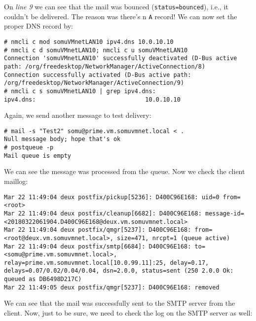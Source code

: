 \noindent
On \textit{line 9} we can see that the mail was bounced (\verb|status=bounced|), i.e., it couldn't be delivered. The reason was there's n \verb|A| record! We can now set the proper DNS record by:

\vspace{-15pt}
\begin{verbatim}
# nmcli c mod somuVMnetLAN10 ipv4.dns 10.0.10.10
# nmcli c d somuVMnetLAN10; nmcli c u somuVMnetLAN10 
Connection 'somuVMnetLAN10' successfully deactivated (D-Bus active path: /org/freedesktop/NetworkManager/ActiveConnection/8)
Connection successfully activated (D-Bus active path: /org/freedesktop/NetworkManager/ActiveConnection/9)
# nmcli c s somuVMnetLAN10 | grep ipv4.dns:
ipv4.dns:                               10.0.10.10
\end{verbatim}
\vspace{-10pt}	

\noindent
Again, we send another message to test delivery:

\vspace{-15pt}
\begin{verbatim}
# mail -s "Test2" somu@prime.vm.somuvmnet.local < .
Null message body; hope that's ok
# postqueue -p
Mail queue is empty
\end{verbatim}
\vspace{-10pt}	

\noindent
We can see the message was processed from the queue. Now we check the client maillog:

\vspace{-15pt}
\begin{verbatim}
Mar 22 11:49:04 deux postfix/pickup[5236]: D400C96E168: uid=0 from=<root>
Mar 22 11:49:04 deux postfix/cleanup[6682]: D400C96E168: message-id=<20180322061904.D400C96E168@deux.vm.somuvmnet.local>
Mar 22 11:49:04 deux postfix/qmgr[5237]: D400C96E168: from=<root@deux.vm.somuvmnet.local>, size=471, nrcpt=1 (queue active)
Mar 22 11:49:04 deux postfix/smtp[6684]: D400C96E168: to=<somu@prime.vm.somuvmnet.local>, relay=prime.vm.somuvmnet.local[10.0.99.11]:25, delay=0.17, delays=0.07/0.02/0.04/0.04, dsn=2.0.0, status=sent (250 2.0.0 Ok: queued as DB6498D217C)
Mar 22 11:49:05 deux postfix/qmgr[5237]: D400C96E168: removed
\end{verbatim}
\vspace{-10pt}	

\noindent
We can see that the mail was successfully sent to the SMTP server from the client. Now, just to be sure, we need to check the log on the SMTP server as well:


